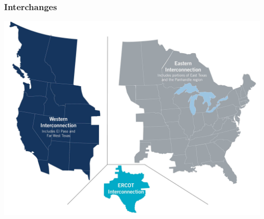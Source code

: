 \documentclass[14pt, unknownkeysallowed]{beamer}
\begin{document}
\begin{frame}
\frametitle{Interchanges}
\begin{center}
\includegraphics[height=.8\textheight]{InternconnectionBranded} %
\end{center}

\end{frame}
\end{document}
